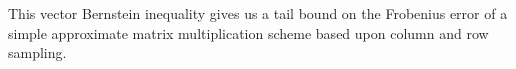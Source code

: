 This vector Bernstein inequality gives us a tail bound on the Frobenius error of a simple approximate matrix multiplication scheme based upon column and row sampling.

